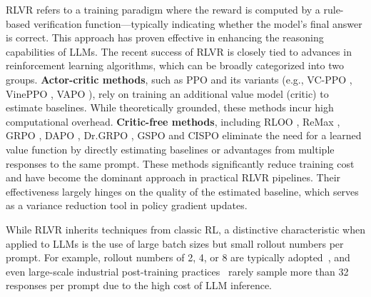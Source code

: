 \documentclass{article}
\makeatletter
\theoremstyle{plain}
\theoremstyle{definition}
\theoremstyle{remark}
\newlength{\secvspace}
\let\originalsubsection\subsection
\renewcommand{\subsection}{\@ifstar{\@subsectionstar}{\@subsectionnormal}}
\newcommand{\@subsectionnormal}[1]{%
  \vspace{-\secvspace}%
  \originalsubsection{#1}%
  \vspace{-\secvspace}%
}
\newcommand{\@subsectionstar}[1]{%
  \vspace{-\secvspace}%
  \originalsubsection*{#1}%
  \vspace{-\secvspace}%
}
\makeatother
\begin{document}
RLVR refers to a training paradigm where the reward is computed by a rule-based verification function—typically indicating whether the model's final answer is correct. This approach has proven effective in enhancing the reasoning capabilities of LLMs. The recent success of RLVR is closely tied to advances in reinforcement learning algorithms, which can be broadly categorized into two groups. \textbf{Actor-critic methods}, such as PPO \citep{schulman2017proximal} and its variants (e.g., VC-PPO \citep{yuan2025s}, VinePPO \citep{kazemnejad2024vineppo}, VAPO \citep{yuan2025vapo}), rely on training an additional value model (critic) to estimate baselines. While theoretically grounded, these methods incur high computational overhead. \textbf{Critic-free methods}, including RLOO \citep{ahmadian2024back}, ReMax \citep{li2023remax}, GRPO \citep{shao2024deepseekmath}, DAPO \citep{yu2025dapo}, Dr.GRPO \citep{liu2025understanding}, GSPO \citep{zheng2025groupsequencepolicyoptimization} and CISPO \citep{minimax2025minimaxm1scalingtesttimecompute} eliminate the need for a learned value function by directly estimating baselines or advantages from multiple responses to the same prompt. These methods significantly reduce training cost and have become the dominant approach in practical RLVR pipelines. Their effectiveness largely hinges on the quality of the estimated baseline, which serves as a variance reduction tool in policy gradient updates.

While RLVR inherits techniques from classic RL, a distinctive characteristic when applied to LLMs is the use of large batch sizes but small rollout numbers per prompt. For example, rollout numbers of 2, 4, or 8 are typically adopted~\citep{shao2024deepseekmath,verl_deepseek671b_grpo_recipe,openrlhf_llama31_8b_grpo_recipe,zhang2025r1vl,chen2025mintcot,kang-etal-2025-grpo,phan2025beyond_reasoning_gains}, and even large-scale industrial post-training practices~\citep{yang2025qwen3,guo2025deepseek,deepseekai2025deepseekv32pushingfrontieropen} rarely sample more than 32 responses per prompt due to the high cost of LLM inference. 

\subsection{Baselines in Policy Gradient Methods}
\end{document}
